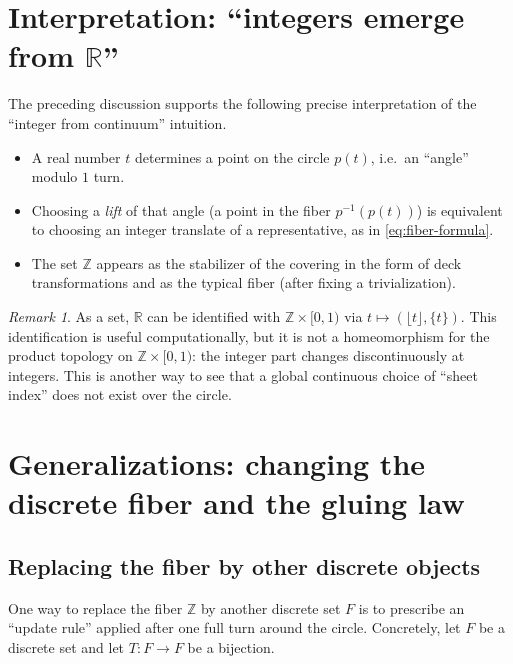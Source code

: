 \documentclass[11pt,a4paper]{article}
\theoremstyle{definition}
\theoremstyle{remark}
\newtheorem{remark}[theorem]{Remark}
\begin{document}
\section{Interpretation: ``integers emerge from \(\mathbb{R}\)''}
\label{sec:interpretation}

The preceding discussion supports the following precise interpretation of the ``integer from continuum'' intuition.

\begin{itemize}
\item A real number \(t\) determines a point on the circle \(p(t)\), i.e.\ an ``angle'' modulo \(1\) turn.
\item Choosing a \emph{lift} of that angle (a point in the fiber \(p^{-1}(p(t))\)) is equivalent to choosing an integer translate of a representative, as in \cref{eq:fiber-formula}.
\item The set \(\mathbb{Z}\) appears as the stabilizer of the covering in the form of deck transformations and as the typical fiber (after fixing a trivialization).
\end{itemize}

\begin{remark}
As a set, \(\mathbb{R}\) can be identified with \(\mathbb{Z}\times [0,1)\) via \(t\mapsto (\lfloor t\rfloor, \{t\})\). This identification is useful computationally, but it is not a homeomorphism for the product topology on \(\mathbb{Z}\times [0,1)\): the integer part changes discontinuously at integers. This is another way to see that a global continuous choice of ``sheet index'' does not exist over the circle.
\end{remark}

\section{Generalizations: changing the discrete fiber and the gluing law}
\label{sec:generalizations}

\subsection{Replacing the fiber by other discrete objects}
\label{sec:discrete-fiber}

One way to replace the fiber \(\mathbb{Z}\) by another discrete set \(F\) is to prescribe an ``update rule'' applied after one full turn around the circle. Concretely, let \(F\) be a discrete set and let \(T:F\to F\) be a bijection.
\end{document}
